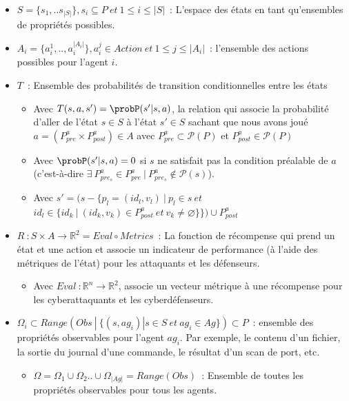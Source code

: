\begin{itemize}
  \item $S = \{s_1, ..s_{|S|}\}, s_{i} \subseteq P \: et \: 1 \le i \le |S|$~: L'espace des états en tant qu'ensembles de propriétés possibles.

  \item $A_{i} = \{a_{i}^{1},..,a_{i}^{|A_{i}|}\}, a_{i}^j \in Action \: et \: 1 \le j \le |A_i|$~: l'ensemble des actions possibles pour l'agent $i$.

  \item $T$~: Ensemble des probabilités de transition conditionnelles entre les états
        \begin{itemize}
          \item Avec $T(s,a,s') = \probP(s'|s,a)$, la relation qui associe la probabilité d'aller de l'état $s \in S$ à l'état $s' \in S$ sachant que nous avons joué $a = (P^a_{pre} \times P^a_{post}) \in A$ avec $P^a_{pre} \subset \mathcal{P}(P)$ et $P^a_{post} \in \mathcal{P}(P)$
          \item Avec $\probP(s'|s,a) = 0$ si $s$ ne satisfait pas la condition préalable de $a$ (c'est-à-dire $\exists \: P_{pre_s}^{a} \in P_{pre}^{a} \: | \: P_{pre_s}^{a} \not\in \mathcal{P}(s)$).
          \item Avec $s' = (s - \{p_l=(id_l, v_l) \: | \: p_l \in s \: et$ $id_l \in \{id_k \: | \: (id_k, v_k) \in P^a_{post} \: et \: v_k \neq \varnothing\}\}) \cup P^a_{post}$
        \end{itemize}



  \item $R~: S \times A \rightarrow \mathbb{R}^2 = Eval \circ Metrics$~: La fonction de récompense qui prend un état et une action et associe un indicateur de performance (à l'aide des métriques de l'état) pour les attaquants et les défenseurs.
        \begin{itemize}
          \item Avec $Eval~: \mathbb{R}^{n} \rightarrow \mathbb{R}^2$, associe un vecteur métrique à une récompense pour les cyberattaquants et les cyberdéfenseurs.
        \end{itemize}



  \item $\Omega_{i} \subset Range(Obs \: | \: \{ (s, ag_i) | s \in S \: et \: ag_i \in Ag \}) \subset P$~: ensemble des propriétés observables pour l'agent $ag_i$. Par exemple, le contenu d'un fichier, la sortie du journal d'une commande, le résultat d'un scan de port, etc.
        \begin{itemize}
          \item $\Omega = \Omega_1 \cup \Omega_2 .. \cup \Omega_{|Ag|} = Range(Obs)$~: Ensemble de toutes les propriétés observables pour tous les agents.
        \end{itemize}


\end{itemize}
